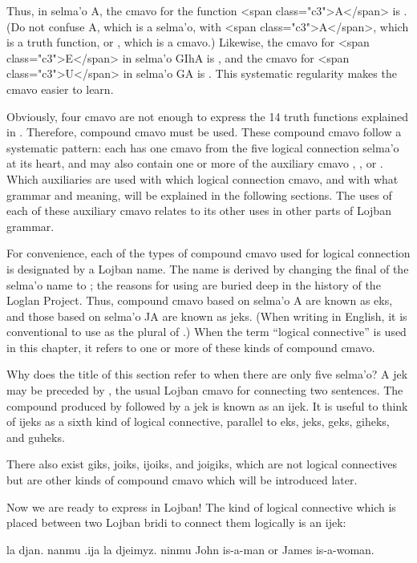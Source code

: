 Thus, in selma'o A, the cmavo for the function <span
    class="c3">A</span> is . (Do not confuse A, which is a
    selma'o, with <span class="c3">A</span>, which is a truth
    function, or , which is a cmavo.) Likewise, the cmavo for
    <span class="c3">E</span> in selma'o GIhA is , and the
    cmavo for <span class="c3">U</span> in selma'o GA is .
    This systematic regularity makes the cmavo easier to learn.

Obviously, four cmavo are not enough to express the 14 truth
    functions explained in . Therefore,
    compound cmavo must be used. These compound cmavo follow a
    systematic pattern: each has one cmavo from the five logical
    connection selma'o at its heart, and may also contain one or
    more of the auxiliary cmavo , , or . Which
    auxiliaries are used with which logical connection cmavo, and
    with what grammar and meaning, will be explained in the
    following sections. The uses of each of these auxiliary cmavo
    relates to its other uses in other parts of Lojban grammar.

For convenience, each of the types of compound cmavo used
    for logical connection is designated by a Lojban name. The name
    is derived by changing the final  of the selma'o name to
    ; the reasons for using  are buried deep in the
    history of the Loglan Project. Thus, compound cmavo based on
    selma'o A are known as eks, and those based on selma'o JA are
    known as jeks. (When writing in English, it is conventional to
    use  as the plural of .) When the term ``logical
    connective'' is used in this chapter, it refers to one or more
    of these kinds of compound cmavo.

Why does the title of this section refer to 
    when there are only five selma'o? A jek may be preceded by
    , the usual Lojban cmavo for connecting two sentences.
    The compound produced by  followed by a jek is known as
    an ijek. It is useful to think of ijeks as a sixth kind of
    logical connective, parallel to eks, jeks, geks, giheks, and
    guheks.

There also exist giks, joiks, ijoiks, and joigiks, which are
    not logical connectives but are other kinds of compound cmavo
    which will be introduced later.



Now we are ready to express 
    in Lojban! The kind of logical connective which is placed
    between two Lojban bridi to connect them logically is an
    ijek:
\begin{example}
la djan. nanmu .ija la djeimyz. ninmu\n
John is-a-man or James is-a-woman.
\end{example}

